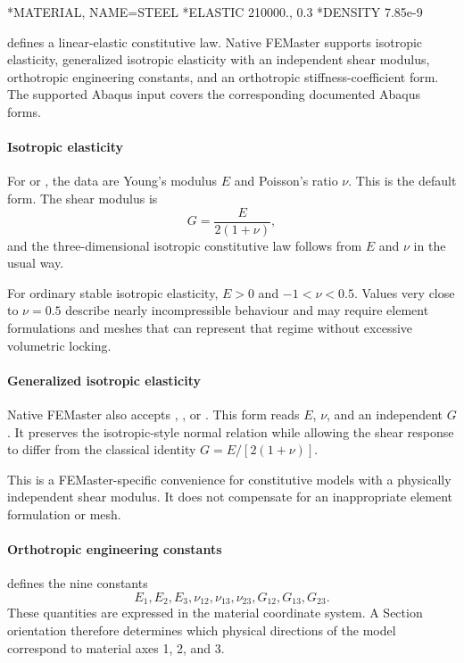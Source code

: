 \begin{inputdeck}
*MATERIAL, NAME=STEEL
*ELASTIC
210000., 0.3
*DENSITY
7.85e-9
\end{inputdeck}



 defines a linear-elastic constitutive law. Native FEMaster supports isotropic elasticity, generalized isotropic elasticity with an independent shear modulus, orthotropic engineering constants, and an orthotropic stiffness-coefficient form. The supported Abaqus input covers the corresponding documented Abaqus forms.

\paragraph*{Isotropic elasticity}

For  or , the data are Young's modulus \(E\) and Poisson's ratio \(\nu\). This is the default form. The shear modulus is
\[
G=\frac{E}{2(1+\nu)},
\]
and the three-dimensional isotropic constitutive law follows from \(E\) and \(\nu\) in the usual way.

For ordinary stable isotropic elasticity, \(E>0\) and \(-1<\nu<0.5\). Values very close to \(\nu=0.5\) describe nearly incompressible behaviour and may require element formulations and meshes that can represent that regime without excessive volumetric locking.

\paragraph*{Generalized isotropic elasticity}

Native FEMaster also accepts , , or . This form reads \(E\), \(\nu\), and an independent \(G\). It preserves the isotropic-style normal relation while allowing the shear response to differ from the classical identity \(G=E/[2(1+\nu)]\).

This is a FEMaster-specific convenience for constitutive models with a physically independent shear modulus. It does not compensate for an inappropriate element formulation or mesh.

\paragraph*{Orthotropic engineering constants}

 defines the nine constants
\[
E_1,E_2,E_3,\nu_{12},\nu_{13},\nu_{23},G_{12},G_{13},G_{23}.
\]
These quantities are expressed in the material coordinate system. A Section orientation therefore determines which physical directions of the model correspond to material axes 1, 2, and 3.

